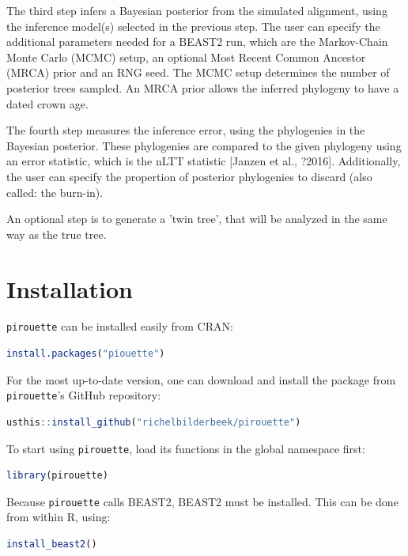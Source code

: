 \documentclass{article}
\begin{document}
The third step infers a Bayesian posterior from the simulated alignment,
using the inference model(s) selected in the previous step. The user
can specify the additional parameters needed for a BEAST2 run, which
are the Markov-Chain Monte Carlo (MCMC) setup, 
an optional Most Recent Common Ancestor (MRCA) prior and an RNG seed.
The MCMC setup determines the number of posterior trees sampled.
An MRCA prior allows the inferred phylogeny to have a dated crown age.

The fourth step measures the inference error, using the phylogenies in the
Bayesian posterior. These phylogenies are compared to the given
phylogeny using an error statistic, which is the nLTT 
statistic [Janzen et al., ?2016]. Additionally, the user can specify the
propertion of posterior phylogenies to discard (also called: the burn-in).

An optional step is to generate a 'twin tree', that will be
analyzed in the same way as the true tree.

\section{Installation}

\verb;pirouette; can be installed easily from CRAN:

\begin{lstlisting}[language=R, floatplacement=H]
install.packages("piouette")
\end{lstlisting}

For the most up-to-date version, 
one can download and install the package from \verb;pirouette;'s GitHub repository:

\begin{lstlisting}[language=R, floatplacement=H]
usthis::install_github("richelbilderbeek/pirouette")
\end{lstlisting}
To start using \verb;pirouette;, load its functions in the global namespace first:

\begin{lstlisting}[language=R, floatplacement=H]
library(pirouette)
\end{lstlisting}
Because \verb;pirouette; calls BEAST2, BEAST2 must be installed. 
This can be done from within R, using:

\begin{lstlisting}[language=R, floatplacement=H]
install_beast2()
\end{lstlisting}
\end{document}
